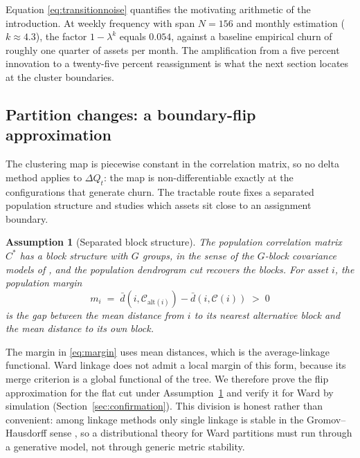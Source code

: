 \documentclass[11pt]{article}
\newtheorem{assumption}{Assumption}
\theoremstyle{remark}
\begin{document}
Equation \eqref{eq:transitionnoise} quantifies the motivating arithmetic of
the introduction. At weekly frequency with span $N=156$ and monthly estimation
($k \approx 4.3$), the factor $1-\lambda^{k}$ equals $0.054$, against a
baseline empirical churn of roughly one quarter of assets per month. The
amplification from a five percent innovation to a twenty-five percent
reassignment is what the next section locates at the cluster boundaries.

\subsection{Partition changes: a boundary-flip approximation}

The clustering map is piecewise constant in the correlation matrix, so no delta
method applies to $\Delta Q_t$: the map is non-differentiable exactly at the
configurations that generate churn. The tractable route fixes a separated
population structure and studies which assets sit close to an assignment
boundary.

\begin{assumption}[Separated block structure]
\label{ass:block}
The population correlation matrix $C^{*}$ has a block structure with $G$
groups, in the sense of the $G$-block covariance models of
\citet{bunea2020model}, and the population dendrogram cut recovers the blocks.
For asset $i$, the population margin
\begin{equation}
m_i \;=\; \bar{d}\left(i, \mathcal{C}_{\mathrm{alt}(i)}\right)
- \bar{d}\left(i, \mathcal{C}(i)\right)
\;>\; 0
\label{eq:margin}
\end{equation}
is the gap between the mean distance from $i$ to its nearest alternative block
and the mean distance to its own block.
\end{assumption}

The margin in \eqref{eq:margin} uses mean distances, which is the
average-linkage functional. Ward linkage does not admit a local margin of this
form, because its merge criterion is a global functional of the tree. We
therefore prove the flip approximation for the flat cut under
Assumption~\ref{ass:block} and verify it for Ward by simulation
(Section~\ref{sec:confirmation}). This division is honest rather than
convenient: among linkage methods only single linkage is stable in the
Gromov--Hausdorff sense \citep{carlsson2010characterization}, so a
distributional theory for Ward partitions must run through a generative model,
not through generic metric stability.
\end{document}
